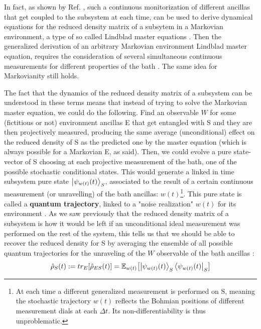 \documentclass[11pt, a4paper]{article} %
\begin{document}
In fact, as shown by Ref. \cite{continousMeas}, such a continuous monitorization of different ancillas that get coupled to the subsystem at each time, can be used to derive dynamical equations for the reduced density matrix of a subsytem in a Markovian environment, a type of so called Lindblad master equations \cite{Generalized, MarkovianityDefs}. Then the generalized derivation of an arbitrary Markovian environment Lindblad master equation, requires the consideration of several simultaneous continuous measurements for different properties of the bath \cite{continousMeas, MarkovianityDefs}. The same idea for Markovianity still holds.

The fact that the dynamics of the reduced density matrix of a subsystem can be understood in these terms means that instead of trying to solve the Markovian master equation, we could do the following. Find an observable $W$ for some (fictitious or not) environment ancillas E that get entangled with S and they are then projectively measured, producing the same average (unconditional) effect on the reduced density of S as the predicted one by the master equation (which is always possible for a Markovian E, as said). Then, we could evolve a pure state-vector of S choosing at each projective measurement of the bath, one of the possible stochastic conditional states. This would generate a linked in time subsystem pure state $\ket{\psi_{w(t)}(t)}_S$, associated to the result of a certain continuous measurement (or unravelling) of the bath ancillas: $w(t)$\footnote{At each time a different generalized measurement is performed on S, meaning the stochastic trajectory $w(t)$ reflects the Bohmian positions of different measurement dials at each $\Delta t$. Its non-differentiability is thus unproblematic.}. This pure state is called a {\bf quantum trajectory}, linked to a "noise realization" $w(t)$ for its environment \cite{Generalized, MarkovianityDefs, QuantumTrajs}. As we saw previously that the reduced density matrix of a subsystem is how it would be left if an unconditional ideal measurement was performed on the rest of the system, this tells us that we should be able to recover the reduced density for S by averaging the ensemble of all possible quantum trajectories for the unraveling of the $W$ observable of the bath ancillas \cite{MarkovianityDefs,QuantumTrajs}:\vspace{-0.17cm}
\begin{equation}
\hat{\rho}_S(t):=tr_{E}[\hat{\rho}_{ES}(t)]=\mathbb{E}_{w(t)}\qty[\ket{\psi_{w(t)}(t)}_S\bra{\psi_{w(t)}(t)}_S] \vspace{-0.13cm}
\end{equation}
\end{document}

